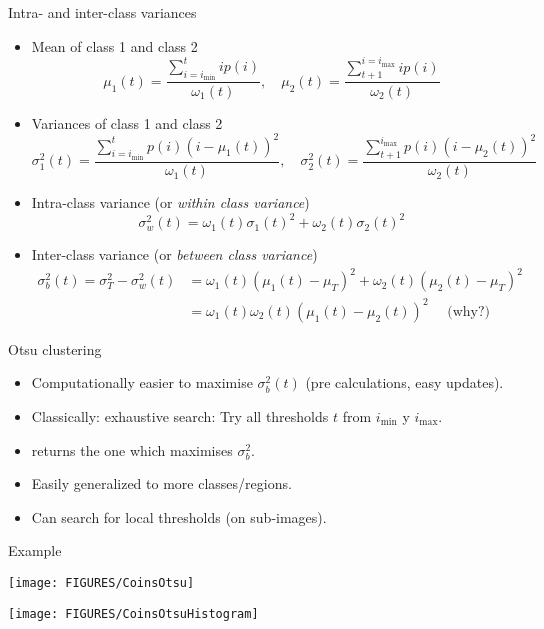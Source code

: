 \documentclass[9pt]{beamer}
\begin{document}
\begin{frame}{Intra- and inter-class variances}
  \begin{itemize}[<+->]
  \item Mean of class 1 and class 2
    $$
    \mu_1(t) = \frac{ \sum_{i=i_{\min}}^t ip(i)}{\omega_1(t)},\quad
    \mu_2(t) = \frac{ \sum_{t+1}^{i=i_{\max}} ip(i)}{\omega_2(t)}
    $$
  \item Variances of class 1 and class 2
    $$
    \sigma_1^2(t) = \frac{ \sum_{i=i_{\min}}^t p(i)(i-\mu_1(t))^2}{\omega_1(t)},\quad
    \sigma_2^2(t) = \frac{ \sum_{t+1}^{i_{\max}} p(i)(i-\mu_2(t))^2}{\omega_2(t)}
    $$
  \item Intra-class variance (or \emph{within class variance})
    $$
    \sigma_w^2(t) = \omega_1(t)\sigma_1(t)^2 + \omega_2(t)\sigma_2(t)^2 
    $$
  \item Inter-class variance (or \emph{between class variance})
    \begin{align*}
      \sigma_b^2(t) = \sigma_T^2 - \sigma_w^2(t) &= \omega_1(t)(\mu_1(t)-\mu_T)^2 + \omega_2(t)(\mu_2(t)-\mu_T)^2\\
      &=\omega_1(t)\omega_2(t)\left(\mu_1(t)-\mu_2(t)\right)^2\quad\text{ (why?)}
    \end{align*}
  \end{itemize}
\end{frame}

\begin{frame}{Otsu clustering}
  \begin{itemize}
  \item Computationally easier to maximise $\sigma_b^2(t)$ (pre calculations, easy updates).\vfill
  \item Classically: exhaustive search: Try all thresholds $t$ from $i_{\min}$ y $i_{\max}$.\vfill
  \item returns the one which maximises $\sigma_b^2$.\vfill
  \item Easily generalized to more classes/regions.\vfill
  \item Can search for local thresholds (on sub-images).
  \end{itemize}
\end{frame}


\begin{frame}[t]{Example}
  \begin{center}
    \texttt{[image: FIGURES/CoinsOtsu]}
  \end{center}
  \begin{center}
    \texttt{[image: FIGURES/CoinsOtsuHistogram]}
  \end{center}
\end{frame}
\end{document}
